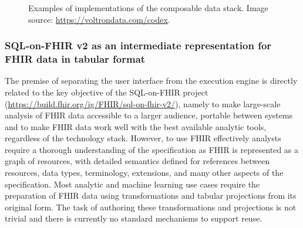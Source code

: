 \documentclass[
  authoryear]{elsarticle}
\begin{document}
\begin{figure}


\caption{\label{fig-cds-examples}Examples of implementations of the
composable data stack. Image source:
\url{https://voltrondata.com/codex}.}

\end{figure}%

\subsubsection{SQL-on-FHIR v2 as an intermediate representation for FHIR
data in tabular
format}\label{sql-on-fhir-v2-as-an-intermediate-representation-for-fhir-data-in-tabular-format}

The premise of separating the user interface from the execution engine
is directly related to the key objective of the SQL-on-FHIR project
(\url{https://build.fhir.org/ig/FHIR/sql-on-fhir-v2/}), namely to make
large-scale analysis of FHIR data accessible to a larger audience,
portable between systems and to make FHIR data work well with the best
available analytic tools, regardless of the technology stack. However,
to use FHIR effectively analysts require a thorough understanding of the
specification as FHIR is represented as a graph of resources, with
detailed semantics defined for references between resources, data types,
terminology, extensions, and many other aspects of the specification.
Most analytic and machine learning use cases require the preparation of
FHIR data using transformations and tabular projections from its
original form. The task of authoring these transformations and
projections is not trivial and there is currently no standard mechanisms
to support reuse.
\end{document}
